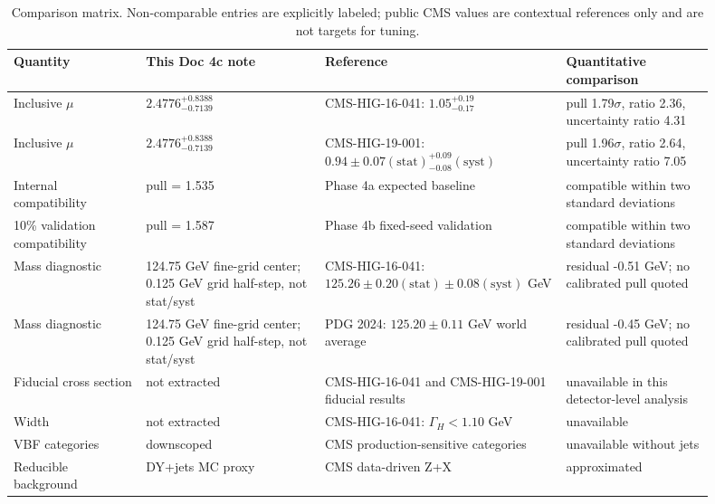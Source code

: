 \documentclass[11pt]{article}
\begin{document}
\begin{table}[htbp]
\centering
\caption{Comparison matrix. Non-comparable entries are explicitly labeled; public CMS values are contextual references only and are not targets for tuning.}
\begin{small}
\begin{tabular}{p{0.17\linewidth}p{0.23\linewidth}p{0.31\linewidth}p{0.19\linewidth}}
\toprule
Quantity & This Doc 4c note & Reference & Quantitative comparison \\
\midrule
Inclusive $\mu$ & $2.4776^{+0.8388}_{-0.7139}$ & CMS-HIG-16-041: $1.05^{+0.19}_{-0.17}$ & pull 1.79$\sigma$, ratio 2.36, uncertainty ratio 4.31 \\
Inclusive $\mu$ & $2.4776^{+0.8388}_{-0.7139}$ & CMS-HIG-19-001: $0.94\pm0.07\mathrm{(stat)}^{+0.09}_{-0.08}\mathrm{(syst)}$ & pull 1.96$\sigma$, ratio 2.64, uncertainty ratio 7.05 \\
Internal compatibility & pull = 1.535 & Phase 4a expected baseline & compatible within two standard deviations \\
10\% validation compatibility & pull = 1.587 & Phase 4b fixed-seed validation & compatible within two standard deviations \\
Mass diagnostic & 124.75 GeV fine-grid center; 0.125 GeV grid half-step, not stat/syst & CMS-HIG-16-041: $125.26\pm0.20\mathrm{(stat)}\pm0.08\mathrm{(syst)}$ GeV & residual -0.51 GeV; no calibrated pull quoted \\
Mass diagnostic & 124.75 GeV fine-grid center; 0.125 GeV grid half-step, not stat/syst & PDG 2024: $125.20\pm0.11$ GeV world average & residual -0.45 GeV; no calibrated pull quoted \\
Fiducial cross section & not extracted & CMS-HIG-16-041 and CMS-HIG-19-001 fiducial results & unavailable in this detector-level analysis \\
Width & not extracted & CMS-HIG-16-041: $\Gamma_H<1.10$ GeV & unavailable \\
VBF categories & downscoped & CMS production-sensitive categories & unavailable without jets \\
Reducible background & DY+jets MC proxy & CMS data-driven Z+X & approximated \\
\bottomrule
\end{tabular}
\end{small}
\label{tab:comparison}
\end{table}
\end{document}
